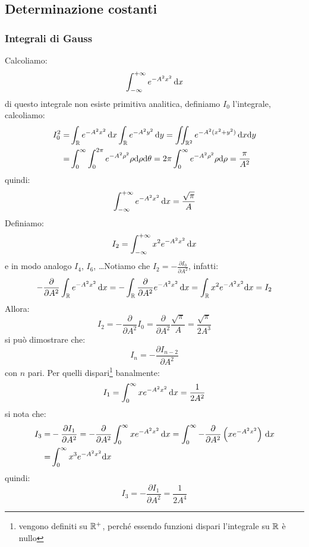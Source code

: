 \subsection{Determinazione costanti}
\subsubsection{Integrali di Gauss}
Calcoliamo:
\begin{equation}
	\int_{-\infty}^{+\infty}e^{-A^2x^2}\,\mathrm{d} x
\end{equation}
di questo integrale non esiste primitiva analitica, definiamo $I_0$ l'integrale, calcoliamo:
\begin{equation}
	\begin{split}
		I_0^2=&\int_{\mathbb{R}}e^{-A^2x^2}\,\mathrm{d} x\int_{\mathbb{R}}e^{-A^2y^2}\,\mathrm{d} y=\iint_{\mathbb{R}^2}e^{-A^2(x^2+y^2)}\,\mathrm{d} x\mathrm{d} y\\
		=&\int_0^\infty\int_0^{2\pi} e^{-A^2\rho^2}\rho\mathrm{d}\rho\mathrm{d}\theta=2\pi\int_0^\infty e^{-A^2\rho^2}\rho\mathrm{d} \rho=\frac{\pi}{A^2}
	\end{split}
\end{equation}
quindi:
\begin{equation}
	\int_{-\infty}^{+\infty}e^{-A^2x^2}\,\mathrm{d} x=\frac{\sqrt{\pi}}{A}
\end{equation}
Definiamo:
\begin{equation}
	I_2=\int_{-\infty}^{+\infty}x^2e^{-A^2x^2}\,\mathrm{d} x
\end{equation}
e in modo analogo $I_4$, $I_6$, \ldots Notiamo che $I_2=-\frac{\partial I_0}{\partial A^2}$, infatti:
\begin{equation}
	-\frac{\partial}{\partial A^2}\int_{\mathbb{R}}e^{-A^2x^2}\,\mathrm{d} x=-\int_{\mathbb{R}}\frac{\partial}{\partial A^2}e^{-A^2x^2}\,\mathrm{d} x=\int_{\mathbb{R}}x^2e^{-A^2x^2}\mathrm{d} x=I_2
\end{equation}
Allora:
\begin{equation}
	I_2=-\frac{\partial}{\partial A^2}I_0=\frac{\partial}{\partial A^2}\frac{\sqrt{\pi}}{A}=\frac{\sqrt{\pi}}{2A^3}
\end{equation}
si può dimostrare che:
\begin{equation}
	I_n=-\frac{\partial I_{n-2}}{\partial A^2}
\end{equation}
con $n$ pari. Per quelli dispari\footnote{vengono definiti su $\mathbb{R}^+$, perché essendo funzioni dispari l'integrale su $\mathbb{R}$ è nullo} banalmente:
\begin{equation}
	I_1=\int_0^{\infty}xe^{-A^2x^2}\,\mathrm{d} x=\frac{1}{2A^2}
\end{equation}
si nota che:
\begin{equation}
	\begin{split}
		I_3=&-\frac{\partial I_1}{\partial A^2}=-\frac{\partial}{\partial A^2}\int_0^\infty xe^{-A^2x^2}\,\mathrm{d} x=\int_0^{\infty}-\frac{\partial}{\partial A^2}\left(xe^{-A^2x^2}\right)\,\mathrm{d} x\\
		=&\int_0^\infty x^3e^{-A^2 x^2}\mathrm{d} x
	\end{split}
\end{equation}
quindi:
\begin{equation}
	I_3=-\frac{\partial I_1}{\partial A^2}=\frac{1}{2A^4}
	\label{Itre}
\end{equation}
